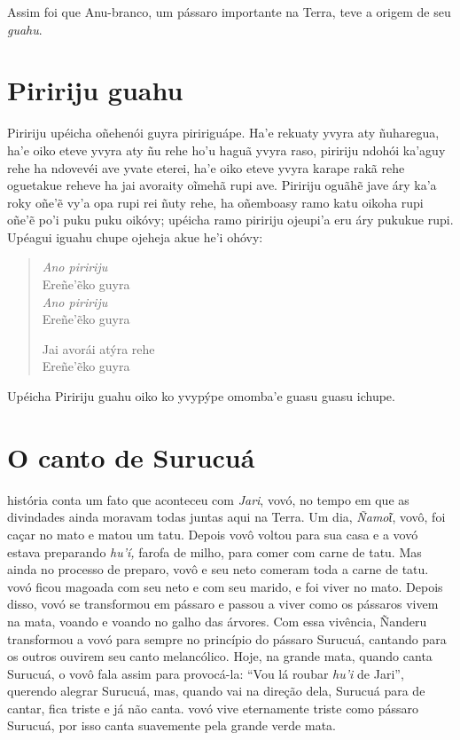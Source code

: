 
Assim foi que Anu-branco, um pássaro importante na Terra, teve a origem
de seu \textit{guahu}.

\chapter{Piririju guahu}

 Piririju upéicha oñehenói guyra piririguápe. Ha'e rekuaty yvyra
aty ñuharegua, ha'e oiko eteve yvyra aty ñu rehe ho'u haguã yvyra raso,
piririju ndohói ka'aguy rehe ha ndovevéi ave yvate eterei, ha'e oiko
eteve yvyra karape rakã rehe oguetakue reheve ha jai avoraity oĩmehã
rupi ave. Piririju oguãhẽ jave áry ka'a roky oñe'ẽ vy'a opa rupi rei
ñuty rehe, ha oñemboasy ramo katu oikoha rupi oñe'ẽ po'i puku puku
oikóvy; upéicha ramo piririju ojeupi'a eru áry pukukue rupi. Upéagui
iguahu chupe ojeheja akue he'i ohóvy:

\begin{verse}
\textit{Ano piririju}\\
Ereñe'ẽko guyra\\
\textit{Ano piririju}\\
Ereñe'ẽko guyra
       
Jai avorái atýra rehe\\
Ereñe'ẽko guyra
\end{verse}

Upéicha Piririju guahu oiko ko yvypýpe omomba'e guasu guasu ichupe.

\chapter{O canto de Surucuá}

 história conta um fato que aconteceu com \textit{Jari}, vovó, no
tempo em que as divindades ainda moravam todas juntas aqui na Terra. Um
dia, \textit{Ñamoῖ}, vovô, foi caçar no mato e matou um tatu. Depois vovô
voltou para sua casa e a vovó estava preparando \textit{hu'í,} farofa de
milho, para comer com carne de tatu. Mas ainda no processo de preparo,
vovô e seu neto comeram toda a carne de tatu. vovó ficou magoada com seu
neto e com seu marido, e foi viver no mato. Depois disso, vovó se
transformou em pássaro e passou a viver como os pássaros vivem na mata,
voando e voando no galho das árvores. Com essa vivência, Ñanderu
transformou a vovó para sempre no princípio do pássaro Surucuá, cantando
para os outros ouvirem seu canto melancólico. Hoje, na grande mata,
quando canta Surucuá, o vovô fala assim para provocá-la: ``Vou lá roubar
\textit{hu'i} de Jari'', querendo alegrar Surucuá, mas, quando vai na
direção dela, Surucuá para de cantar, fica triste e já não canta. vovó
vive eternamente triste como pássaro Surucuá, por isso canta suavemente
pela grande verde mata.

